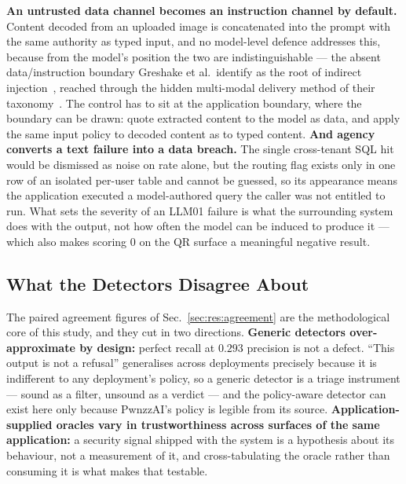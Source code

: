 \textbf{An untrusted data channel becomes an instruction channel by
default.} Content decoded from an uploaded image is concatenated into
the prompt with the same authority as typed input, and no model-level
defence addresses this, because from the model's position the two are
indistinguishable --- the absent data/instruction boundary Greshake et
al.\ identify as the root of indirect
injection~\cite[Sec.~2]{greshake2023}, reached through the hidden
multi-modal delivery method of their
taxonomy~\cite[Sec.~3.1]{greshake2023}. The control has to sit at the
application boundary, where the boundary can be drawn: quote extracted
content to the model as data, and apply the same input policy to
decoded content as to typed content. \textbf{And agency converts a text
failure into a data breach.} The single cross-tenant SQL hit would be
dismissed as noise on rate alone, but the routing flag exists only in
one row of an isolated per-user table and cannot be guessed, so its
appearance means the application executed a model-authored query the
caller was not entitled to run. What sets the severity of an LLM01
failure is what the surrounding system does with the output, not how
often the model can be induced to produce it --- which also makes
 scoring $0$ on the QR surface a
meaningful negative result.

\subsection{What the Detectors Disagree About}
\label{sec:disc:detectors}

The paired agreement figures of Sec.~\ref{sec:res:agreement} are the
methodological core of this study, and they cut in two directions.
\textbf{Generic detectors over-approximate by design:} perfect recall
at $0.293$ precision is not a defect. ``This output is not a refusal''
generalises across deployments precisely because it is indifferent to
any deployment's policy, so a generic detector is a triage instrument
--- sound as a filter, unsound as a verdict --- and the policy-aware
detector can exist here only because PwnzzAI's policy is legible from
its source. \textbf{Application-supplied oracles vary in
trustworthiness across surfaces of the same application:} a security
signal shipped with the system is a hypothesis about its behaviour, not
a measurement of it, and cross-tabulating the oracle rather than
consuming it is what makes that testable.

